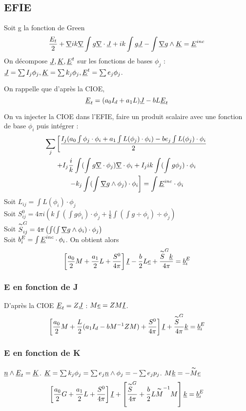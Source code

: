 \subsection{EFIE}
Soit g la fonction de Green
\[
  \dfrac{E_t}{2}+\underline{\nabla}{i}{k}\underline{\nabla} \int  g\underline{\nabla} \cdot\underline{J} +  ik\int g\underline{J} - \int \underline{\nabla} g \wedge \underline{K} = \underline{E}^{inc}
  \]
On décompose $\underline{J},\underline{K},\underline{E}^t$ sur les fonctions de bases $\phi_j$ : $\underline{J} = \sum I_j \phi_j,\underline{K} = \sum k_j \phi_j,\underline{E}^t = \sum e_j \phi_j$. 

On rappelle que d’après la CIOE,
\[
  \underline{E}_t = (a_0I_d+a_1L)\underline{J} -bL\underline{E}_t
\]

On va injecter la CIOE dans l'EFIE, faire un produit scalaire avec une fonction de base $\phi_i$ puis intégrer : 
\begin{multline}
  \sum_j \left [\dfrac{I_j(a_0\int \phi_j \cdot \phi_i +a_1\int L(\phi_j) \cdot \phi_i) -be_j \int L(\phi_j)\cdot \phi_i}{2} \right. \\
  +I_j\dfrac{i}{k}\int (\int g\underline{\nabla} \cdot\phi_j)\underline{\nabla} \cdot \phi_i +  I_j ik\int (\int g\phi_j)\cdot \phi_i\\
  \left. -  k_j\int(\int \underline{\nabla} g \wedge \phi_j) \cdot \phi_i \right]= \int \underline{E}^{inc} \cdot \phi_i
\end{multline}
Soit $L_{ij} = \int L(\phi_i)\cdot\phi_j$\\
Soit $S^0_{ij}=4\pi i\left(k\int(\int g\phi_i)\cdot\phi_j + \frac{1}{k}\int(\int g\div\phi_i)\div\phi_j\right)$\\ 
Soit $\overset{\thicksim}{S}^G_{ij} = 4\pi\left(\int(\int \underline{\nabla} g \wedge \phi_i) \cdot \phi_j \right)$\\
Soit $b_i^E = \int \underline{E}^{inc} \cdot \phi_i$.
On obtient alors 
\[
  \left[\dfrac{a_0}{2}M + \dfrac{a_1}{2}L + \dfrac{S^0}{4\pi}\right]\underline{I} - \dfrac{b}{2}L\underline{e}+ \dfrac{\overset{\thicksim}{S}^G \underline{k}}{4\pi} = \underline{b}_i^E
\]
\subsubsection{E en fonction de J}
D’après la CIOE $\underline{E}_t = Z\underline{J}$ : $M\underline{e} = Z M\underline{I}$.
\[
  \left[\dfrac{a_0}{2}M + \dfrac{L}{2}(a_1I_d - bM^{-1}ZM) + \dfrac{S^0}{4\pi}\right]\underline{I} + \dfrac{\overset{\thicksim}{S}^G }{4\pi}\underline{k} = \underline{b}_i^E
\]
\subsubsection{E en fonction de K}
$\underline{n} \wedge \underline{E}_t = \underline{K}$.
$\underline{K} = \sum k_j \phi_j = \sum e_j \underline{n} \wedge \phi_j = -\sum e_j p_j $.
$M \underline{k} = - \overset{\thicksim}{M} \underline{e}$
\[
  \left[\dfrac{a_0}{2}G + \dfrac{a_1}{2}L+\dfrac{S^0}{4\pi}\right]\underline{I} + \left[\dfrac{\overset{\thicksim}{S}^G }{4\pi}+  \dfrac{b}{2}L\overset{\thicksim}{M}^{-1}M \right]\underline{k} = \underline{b}_i^E
\]
